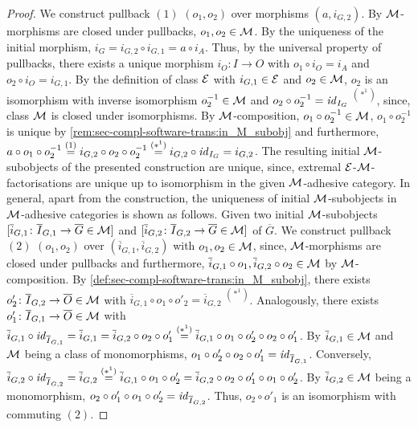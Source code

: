 \begin{proof}
We construct pullback $(1)$ $(o_1,o_2)$ over morphisms $(a,i_{G,2})$.
By ${\cal M}$-morphisms are closed under pullbacks, $o_1,o_2 \in {\cal M}$.
By the uniqueness of the initial morphism, $i_G=i_{G,2} \circ i_{G,1}=a \circ i_A$.
Thus, by the universal property of pullbacks, there exists a unique morphism $i_O\colon I \to O$ with $o_1 \circ i_O=i_A$ and $o_2 \circ i_O=i_{G,1}$.
By the definition of class $\mathcal{E}$ with $i_{G,1} \in \mathcal{E}$ and $o_2 \in {\cal M}$, $o_2$ is an isomorphism with inverse isomorphism $o_2^{-1} \in {\cal M}$ and $o_2 \circ o_2^{-1} = \mathit{id}_{I_G}$ $^{(*^1)}$, since, class ${\cal M}$ is closed under isomorphisms.
By ${\cal M}$-composition, $o_1 \circ o_2^{-1} \in {\cal M}$, $o_1 \circ o_2^{-1}$ is unique by \cref{rem:sec-compl-software-trans:in_M_subobj} and furthermore, $a \circ o_1 \circ o_2^{-1} \stackrel{(1)}{=} i_{G,2} \circ o_2 \circ o_2^{-1} \stackrel{(*^1)}{=} i_{G,2} \circ \mathit{id}_{I_G} = i_{G,2}$.
The resulting initial ${\cal M}$-subobjects of the presented construction are unique, since, extremal $\mathcal{E}$-${\cal M}$-factorisations are unique up to isomorphism in the given ${\cal M}$-adhesive category.
In general, apart from the construction, the uniqueness of initial ${\cal M}$-subobjects in ${\cal M}$-adhesive categories is shown as follows.
Given two initial ${\cal M}$-subobjects $[\overline{i}_{G,1}\colon \overline{I}_{G,1} \to \overline{G} \in {\cal M}]$ and $[\overline{i}_{G,2}\colon \overline{I}_{G,2} \to \overline{G} \in {\cal M}]$ of $\overline{G}$.
We construct pullback $(2)$ $(o_1,o_2)$ over $(\overline{i}_{G,1},\overline{i}_{G,2})$ with $o_1,o_2 \in {\cal M}$, since, ${\cal M}$-morphisms are closed under pullbacks and furthermore, $\overline{i}_{G,1} \circ o_1,\overline{i}_{G,2} \circ o_2\in {\cal M}$ by ${\cal M}$-composition.
By \cref{def:sec-compl-software-trans:in_M_subobj}, there exists $o'_2\colon \overline{I}_{G,2} \to \overline{O} \in {\cal M}$ with $\overline{i}_{G,1} \circ o_1 \circ o'_2=\overline{i}_{G,2}$ $^{(*^1)}$.
Analogously, there exists $o'_1\colon \overline{I}_{G,1} \to \overline{O} \in {\cal M}$ with $\overline{i}_{G,1} \circ \mathit{id}_{\overline{I}_{G,1}} = \overline{i}_{G,1} = \overline{i}_{G,2} \circ o_2 \circ o'_1 \stackrel{(*^1)}{=} \overline{i}_{G,1} \circ o_1 \circ o'_2 \circ o_2 \circ o'_1$.
By $\overline{i}_{G,1} \in {\cal M}$ and ${\cal M}$ being a class of monomorphisms, $o_1 \circ o'_2 \circ o_2 \circ o'_1=\mathit{id}_{\overline{I}_{G,1}}$.
Conversely, $\overline{i}_{G,2} \circ \mathit{id}_{\overline{I}_{G,2}} = \overline{i}_{G,2} \stackrel{(*^1)}{=} \overline{i}_{G,1} \circ o_1 \circ o'_2 = \overline{i}_{G,2} \circ o_2 \circ o'_1 \circ o_1 \circ o'_2$.
By $\overline{i}_{G,2} \in {\cal M}$ being a monomorphism, $o_2 \circ o'_1 \circ o_1 \circ o'_2 = \mathit{id}_{\overline{I}_{G,2}}$.
Thus, $o_2 \circ o'_1$ is an isomorphism with commuting $(2)$.
\end{proof}

